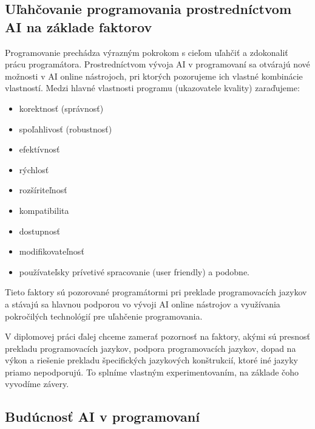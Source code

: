 
\subsection{Uľahčovanie programovania prostredníctvom AI na základe faktorov}

Programovanie prechádza výrazným pokrokom s cieľom uľahčiť a zdokonaliť prácu programátora. Prostredníctvom vývoja AI v programovaní sa otvárajú nové možnosti v AI online nástrojoch, pri ktorých pozorujeme ich vlastné kombinácie vlastností. Medzi hlavné vlastnosti programu (ukazovatele kvality) zaraďujeme:

\begin{itemize}
    \item korektnosť (správnosť)
    \item spoľahlivosť (robustnosť)
    \item efektívnosť
    \item rýchlosť
    \item rozšíriteľnosť
    \item kompatibilita
    \item dostupnosť
    \item modifikovateľnosť
    \item používateľsky prívetivé spracovanie (user friendly) a podobne. 
\end{itemize}

Tieto faktory sú pozorované programátormi pri preklade programovacích jazykov a stávajú sa hlavnou podporou vo vývoji AI online nástrojov a využívania pokročilých technológií pre uľahčenie programovania.
\par V diplomovej práci ďalej chceme zamerať pozornosť na faktory, akými sú presnosť prekladu programovacích jazykov, podpora programovacích jazykov, dopad na výkon a riešenie prekladu špecifických jazykových konštrukcií, ktoré iné jazyky priamo nepodporujú. To splníme vlastným experimentovaním, na základe čoho vyvodíme závery.




\subsection{Budúcnosť AI v programovaní}

